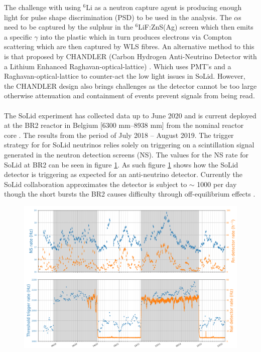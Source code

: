 The challenge with using $^6$Li as a neutron capture agent is producing enough light for pulse shape discrimination (PSD) to be used in the analysis. The $\alpha$s need to be captured by the sulphur in the $^6$LiF:ZnS(Ag) screen which then emits a specific $\gamma$ into the plastic which in turn produces electrons via Compton scattering which are then captured by WLS fibres. An alternative method to this is that proposed by CHANDLER (Carbon Hydrogen Anti-Neutrino Detector with a Lithium Enhanced Raghavan-optical-lattice) \cite{aap2015}. Which uses PMT's and a Raghavan-optical-lattice to counter-act the low light issues in SoLid. However, the CHANDLER design also brings challenges as the detector cannot be too large otherwise attenuation and containment of events prevent signals from being read.
\\\\The SoLid experiment has collected data up to June 2020 and is current deployed at the BR2 reactor in Belgium [6300 mm–8938 mm] from the nominal reactor core \cite{Abreu_2021}. The results from the period of July 2018 -- August 2019. The trigger strategy for for SoLid neutrinos relies solely on triggering on a scintillation signal generated in the
neutron detection screens (NS). The values for the NS rate for SoLid at BR2 can be seen in figure \ref{fig:solidReults}. As such figure \ref{fig:solidReults} shows how the SoLid detector is triggering as expected for an anti-neutrino detector. Currently the SoLid collaboration approximates the detector is subject to $\sim$ 1000 per day though the short bursts the BR2 causes difficulty through off-equilibrium effects \cite{Abreu_2021}. 
\begin{figure}[!h]
 \centering
 \includegraphics[width=0.7\linewidth]{Chapter1/Figs/SoLidResults.png}
 \label{fig:solidReults}
\end{figure}

